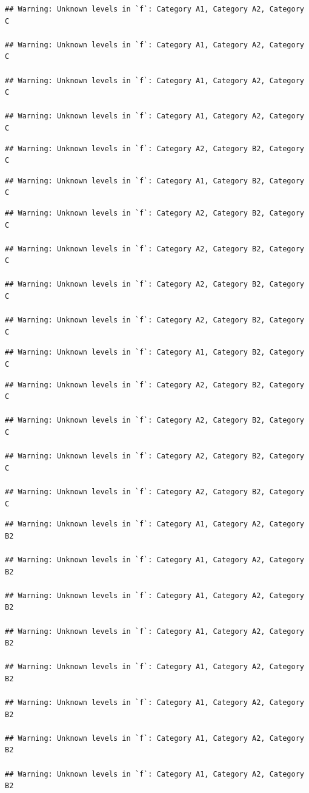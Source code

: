 \documentclass[preprint, 3p,
authoryear]{elsarticle} %
\begin{document}
\begin{verbatim}
## Warning: Unknown levels in `f`: Category A1, Category A2, Category C

## Warning: Unknown levels in `f`: Category A1, Category A2, Category C

## Warning: Unknown levels in `f`: Category A1, Category A2, Category C

## Warning: Unknown levels in `f`: Category A1, Category A2, Category C
\end{verbatim}

\begin{verbatim}
## Warning: Unknown levels in `f`: Category A2, Category B2, Category C
\end{verbatim}

\begin{verbatim}
## Warning: Unknown levels in `f`: Category A1, Category B2, Category C
\end{verbatim}

\begin{verbatim}
## Warning: Unknown levels in `f`: Category A2, Category B2, Category C

## Warning: Unknown levels in `f`: Category A2, Category B2, Category C

## Warning: Unknown levels in `f`: Category A2, Category B2, Category C

## Warning: Unknown levels in `f`: Category A2, Category B2, Category C
\end{verbatim}

\begin{verbatim}
## Warning: Unknown levels in `f`: Category A1, Category B2, Category C
\end{verbatim}

\begin{verbatim}
## Warning: Unknown levels in `f`: Category A2, Category B2, Category C

## Warning: Unknown levels in `f`: Category A2, Category B2, Category C

## Warning: Unknown levels in `f`: Category A2, Category B2, Category C

## Warning: Unknown levels in `f`: Category A2, Category B2, Category C
\end{verbatim}

\begin{verbatim}
## Warning: Unknown levels in `f`: Category A1, Category A2, Category B2

## Warning: Unknown levels in `f`: Category A1, Category A2, Category B2

## Warning: Unknown levels in `f`: Category A1, Category A2, Category B2

## Warning: Unknown levels in `f`: Category A1, Category A2, Category B2

## Warning: Unknown levels in `f`: Category A1, Category A2, Category B2

## Warning: Unknown levels in `f`: Category A1, Category A2, Category B2

## Warning: Unknown levels in `f`: Category A1, Category A2, Category B2

## Warning: Unknown levels in `f`: Category A1, Category A2, Category B2
\end{verbatim}
\end{document}
